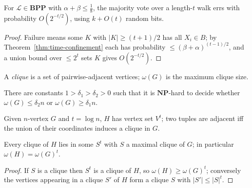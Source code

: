 \begin{theorem}
  \label{thm:two-sided-reduction}
  For $\mathcal L\in\mathbf{BPP}$ with $\alpha+\beta\le\tfrac18$, the majority
  vote over a length-$t$ walk errs with probability $O(2^{-t/2})$, using $k+O(t)$
  random bits.
\end{theorem}
\begin{proof}
  Failure means some $K$ with $|K|\ge(t+1)/2$ has all $X_i\in B$; by
  Theorem~\ref{thm:time-confinement} each has probability
  $\le(\beta+\alpha)^{(t-1)/2}$, and a union bound over $\le2^t$ sets $K$ gives
  $O(2^{-t/2})$.
\end{proof}

\begin{definition}
  \label{def:clique}
  A \emph{clique} is a set of pairwise-adjacent vertices; $\omega(G)$ is the
  maximum clique size.
\end{definition}

\begin{theorem}
  \label{thm:fgl-clique}
  \notready
  There are constants $1>\delta_1>\delta_2>0$ such that it is $\mathbf{NP}$-hard
  to decide whether $\omega(G)\le\delta_2n$ or $\omega(G)\ge\delta_1n$.
\end{theorem}

\begin{construction}
  \label{constr:graph-product-H}
  Given $n$-vertex $G$ and $t=\log n$, $H$ has vertex set $V^t$; two tuples are
  adjacent iff the union of their coordinates induces a clique in $G$.
\end{construction}

\begin{claim}
  \label{claim:clique-H}
  Every clique of $H$ lies in some $S^t$ with $S$ a maximal clique of $G$; in
  particular $\omega(H)=\omega(G)^t$.
\end{claim}
\begin{proof}
  If $S$ is a clique then $S^t$ is a clique of $H$, so
  $\omega(H)\ge\omega(G)^t$; conversely the vertices appearing in a clique $S'$
  of $H$ form a clique $S$ with $|S'|\le|S|^t$.
\end{proof}

